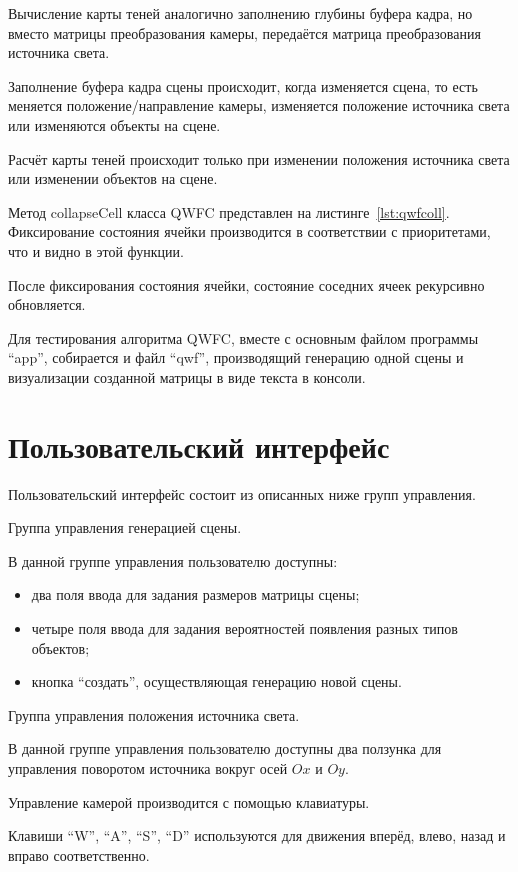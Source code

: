 Вычисление карты теней аналогично заполнению глубины буфера кадра, но вместо матрицы преобразования камеры, передаётся матрица преобразования источника света.

Заполнение буфера кадра сцены происходит, когда изменяется сцена, то есть меняется положение/направление камеры, изменяется положение источника света или изменяются объекты на сцене.

Расчёт карты теней происходит только при изменении положения источника света или изменении объектов на сцене.

Метод collapseCell класса QWFC представлен на листинге~\ref{lst:qwfcoll}. Фиксирование состояния ячейки производится в соответствии с приоритетами, что и видно в этой функции.

После фиксирования состояния ячейки, состояние соседних ячеек рекурсивно обновляется.

Для тестирования алгоритма QWFC, вместе с основным файлом программы ``app'', собирается и файл ``qwf'', производящий генерацию одной сцены и визуализации созданной матрицы в виде текста в консоли.

\section*{Пользовательский интерфейс}

Пользовательский интерфейс состоит из описанных ниже групп управления.

Группа управления генерацией сцены.

В данной группе управления пользователю доступны:
\begin{itemize}
  \item два поля ввода для задания размеров матрицы сцены;
  \item четыре поля ввода для задания вероятностей появления разных типов объектов;
  \item кнопка ``создать'', осуществляющая генерацию новой сцены.
\end{itemize}

Группа управления положения источника света.

В данной группе управления пользователю доступны два ползунка для управления поворотом источника вокруг осей $Ox$ и $Oy$.

Управление камерой производится с помощью клавиатуры. 

Клавиши ``W'', ``A'', ``S'', ``D'' используются для движения вперёд, влево, назад и вправо соответственно.

